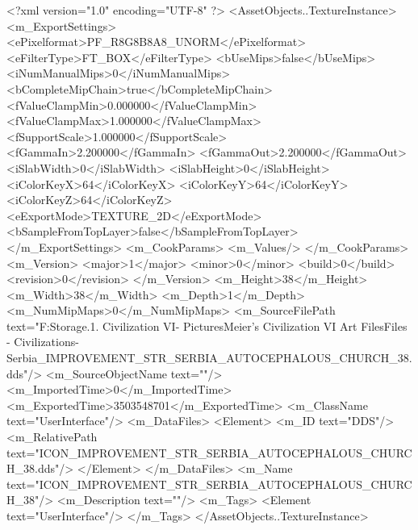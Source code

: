 <?xml version="1.0" encoding="UTF-8" ?>
<AssetObjects..TextureInstance>
	<m_ExportSettings>
		<ePixelformat>PF_R8G8B8A8_UNORM</ePixelformat>
		<eFilterType>FT_BOX</eFilterType>
		<bUseMips>false</bUseMips>
		<iNumManualMips>0</iNumManualMips>
		<bCompleteMipChain>true</bCompleteMipChain>
		<fValueClampMin>0.000000</fValueClampMin>
		<fValueClampMax>1.000000</fValueClampMax>
		<fSupportScale>1.000000</fSupportScale>
		<fGammaIn>2.200000</fGammaIn>
		<fGammaOut>2.200000</fGammaOut>
		<iSlabWidth>0</iSlabWidth>
		<iSlabHeight>0</iSlabHeight>
		<iColorKeyX>64</iColorKeyX>
		<iColorKeyY>64</iColorKeyY>
		<iColorKeyZ>64</iColorKeyZ>
		<eExportMode>TEXTURE_2D</eExportMode>
		<bSampleFromTopLayer>false</bSampleFromTopLayer>
	</m_ExportSettings>
	<m_CookParams>
		<m_Values/>
	</m_CookParams>
	<m_Version>
		<major>1</major>
		<minor>0</minor>
		<build>0</build>
		<revision>0</revision>
	</m_Version>
	<m_Height>38</m_Height>
	<m_Width>38</m_Width>
	<m_Depth>1</m_Depth>
	<m_NumMipMaps>0</m_NumMipMaps>
	<m_SourceFilePath text="F:\Mod Storage\2.1. Civilization VI\Mods\Archive - Pictures\Sid Meier's Civilization VI Art Files\Art Files - Civilizations\Civilization - Serbia\ICON_IMPROVEMENT_STR_SERBIA_AUTOCEPHALOUS_CHURCH_38.dds"/>
	<m_SourceObjectName text=""/>
	<m_ImportedTime>0</m_ImportedTime>
	<m_ExportedTime>3503548701</m_ExportedTime>
	<m_ClassName text="UserInterface"/>
	<m_DataFiles>
		<Element>
			<m_ID text="DDS"/>
			<m_RelativePath text="ICON_IMPROVEMENT_STR_SERBIA_AUTOCEPHALOUS_CHURCH_38.dds"/>
		</Element>
	</m_DataFiles>
	<m_Name text="ICON_IMPROVEMENT_STR_SERBIA_AUTOCEPHALOUS_CHURCH_38"/>
	<m_Description text=""/>
	<m_Tags>
		<Element text="UserInterface"/>
	</m_Tags>
</AssetObjects..TextureInstance>

